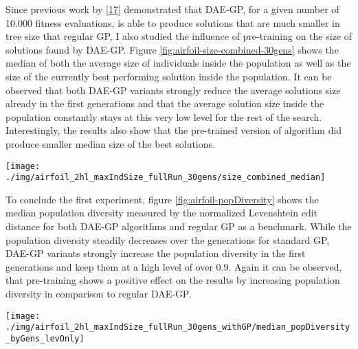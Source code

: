 \documentclass[
  11pt,
]{article}
\let\origfigure\figure
\let\endorigfigure\endfigure
\renewenvironment{figure}[1][2] {
    \expandafter\origfigure\expandafter[H]
} {
    \endorigfigure
}
\begin{document}
Since previous work by {[}\protect\hyperlink{ref-dae-gp_2022_symreg}{17}{]} demonstrated that DAE-GP, for a given number of 10.000 fitness evaluations, is able to produce solutions that are much smaller in tree size that regular GP, I also studied the influence of pre-training on the size of solutions found by DAE-GP. Figure \ref{fig:airfoil-size-combined-30gens} shows the median of both the average size of individuals inside the population as well as the size of the currently best performing solution inside the population. It can be observed that both DAE-GP variants strongly reduce the average solutions size already in the first generations and that the average solution size inside the population constantly stays at this very low level for the rest of the search. Interestingly, the results also show that the pre-trained version of algorithm did produce smaller median size of the best solutions.

\begin{figure}[c]

{\centering \texttt{[image: ./img/airfoil\_2hl\_maxIndSize\_fullRun\_30gens/size\_combined\_median]} 

}

\caption{Median Solution Size over 30 Generations - Airfoil (2HL)}\label{fig:airfoil-size-combined-30gens}
\end{figure}

To conclude the first experiment, figure \ref{fig:airfoil-popDiversity} shows the median population diversity measured by the normalized Levenshtein edit distance for both DAE-GP algorithms and regular GP as a benchmark. While the population diversity steadily decreases over the generations for standard GP, DAE-GP variants strongly increase the population diversity in the first generations and keep them at a high level of over \(0.9\). Again it can be observed, that pre-training shows a positive effect on the results by increasing population diversity in comparison to regular DAE-GP.

\begin{figure}[c]

{\centering \texttt{[image: ./img/airfoil\_2hl\_maxIndSize\_fullRun\_30gens\_withGP/median\_popDiversity\_byGens\_levOnly]} 

}

\caption{Median Population Diversity over 30 Generations - Airfoil (2HL)}\label{fig:airfoil-popDiversity}
\end{figure}
\end{document}
